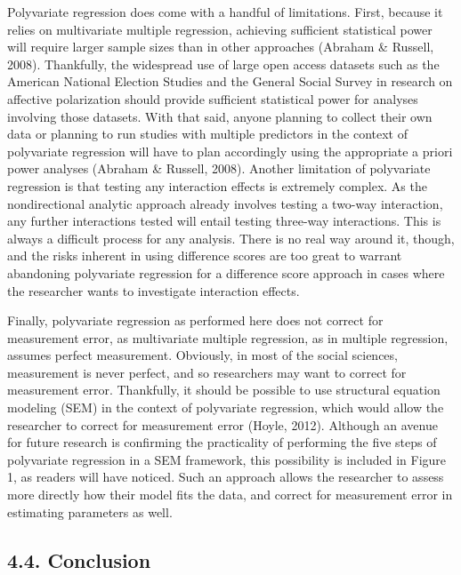 \documentclass[authordate, meta]{jote-new-article}
\begin{document}
	Polyvariate regression does come with a handful of limitations. First, because it relies on multivariate multiple regression, achieving sufficient statistical power will require larger sample sizes than in other approaches (Abraham \& Russell, 2008). Thankfully, the widespread use of large open access datasets such as the American National Election Studies and the General Social Survey in research on affective polarization should provide sufficient statistical power for analyses involving those datasets. With that said, anyone planning to collect their own data or planning to run studies with multiple predictors in the context of polyvariate regression will have to plan accordingly using the appropriate a priori power analyses (Abraham \& Russell, 2008). Another limitation of polyvariate regression is that testing any interaction effects is extremely complex. As the nondirectional analytic approach already involves testing a two-way interaction, any further interactions tested will entail testing three-way interactions. This is always a difficult process for any analysis. There is no real way around it, though, and the risks inherent in using difference scores are too great to warrant abandoning polyvariate regression for a difference score approach in cases where the researcher wants to investigate interaction effects.



	Finally, polyvariate regression as performed here does not correct for measurement error, as multivariate multiple regression, as in multiple regression, assumes perfect measurement. Obviously, in most of the social sciences, measurement is never perfect, and so researchers may want to correct for measurement error. Thankfully, it should be possible to use structural equation modeling (SEM) in the context of polyvariate regression, which would allow the researcher to correct for measurement error (Hoyle, 2012). Although an avenue for future research is confirming the practicality of performing the five steps of polyvariate regression in a SEM framework, this possibility is included in Figure 1, as readers will have noticed. Such an approach allows the researcher to assess more directly how their model fits the data, and correct for measurement error in estimating parameters as well.



	\subsection{4.4. Conclusion}
\end{document}
